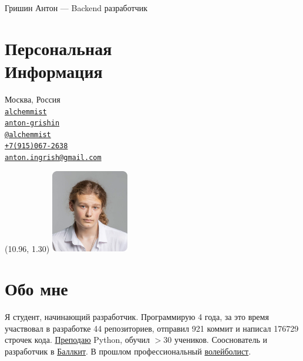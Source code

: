 \documentclass[margin,line]{resume}
\begin{document}
{\vspace*{-13mm}\sc \large Гришин Антон — Backend разработчик} \\
\begin{resume}
  \begin{minipage}[t]{0.55\textwidth}
    \section{\mysidestyle Персональная\\Информация}
    Москва, Россия \\
    \faGithub  \space
    \href{https://github.com/alchemmist/}{\texttt{alchemmist}} \\
    \faLinkedin \space
    \href{https://www.linkedin.com/in/anton-grishin-6966a8362/}{\texttt{anton-grishin}}
    \\
    \faPaperPlane \space \href{https://t.me/alchemmist}{\texttt{@alchemmist}} \\
    \faPhone \space
    \href{tel:+1234567890}{\color{blue}\texttt{+7(915)067-2638}}  \\
    \faEnvelope \space
    \href{mailto:anton.ingrish@gmail.com}{\color{blue}\texttt{anton.ingrish@gmail.com}}
  \end{minipage}

  \begin{minipage}[H]{0.18\textwidth}
    \begin{textblock}{7}(10.96, 1.30)
      \includegraphics[width=0.255\textwidth]{../images/avatar.png}
    \end{textblock}
  \end{minipage}

  \vspace{-7mm}
  \section{\mysidestyle Обо мне}
  Я студент, начинающий разработчик. Программирую 4 года, за
  это время участвовал в разработке 44 репозиториев, отправил 921
  коммит и написал 176729 строчек кода.
  \href{https://www.avito.ru/moskva/predlozheniya_uslug/prepodavatel_programmirovaniya_na_python_2556461612}{Преподаю}
  Python, обучил $> 30$ учеников. Сооснователь и
  разработчик в \href{https://ballkit.ru/}{Баллкит}. В прошлом профессиональный
  \href{https://alchemmist.github.io/CV/attachments/sport.pdf}{волейболист}.


\end{resume}
\end{document}
